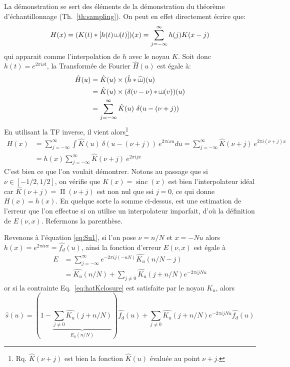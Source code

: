 \documentclass[11pt,twoside]{article}
\DeclareMathOperator{\sinc}{sinc}
\DeclareMathOperator{\comb}{\raisebox{\depth}{\rotatebox{270}{$\exists$}}}
\DeclareMathOperator{\boxcar}{{\mbox{$\Pi$}}}
\newcommand{\nn}{\nonumber}
\begin{document}
La démonstration se sert des éléments de la démonstration du théorème d'échantillonnage (Th.~\ref{th:sampling}).  On peut en effet directement écrire que:
\begin{equation}
H(x) = (K(t)\ast [h(t)\comb(t)])(x) = \sum_{j=-\infty}^\infty h(j) K(x-j)
\end{equation}
qui apparait comme l'interpolation de $h$ avec le noyau $K$. Soit donc $h(t)=e^{2\pi i \nu t}$, la Transformée de Fourier $\hat{H}(u)$ est égale à: 
\begin{align}
\hat{H}(u) &= \hat{K}(u)\times  (\hat{h}\ast \widehat{\comb})(u) \nn \\
&= \hat{K}(u)\times  (\delta(v-\nu)\ast \comb(v))(u) \nn \\
&=   \sum_{j=-\infty}^\infty \hat{K}(u)\ \delta(u-(\nu+j))
\end{align}
En utilisant la TF inverse, il vient alors\footnote{Rq. $\hat{K}(\nu+j)$ est bien la fonction $\hat{K}(u)$ évaluée au point $\nu+j$.}
\begin{align}
H(x) &=  \sum_{j=-\infty}^\infty \int  \hat{K}(u)\ \delta(u-(\nu+j))\ e^{2\pi i xu}du = \sum_{j=-\infty}^\infty \hat{K}(\nu+j)\ e^{2\pi i (\nu+j)x} \nn \\
&= h(x) \sum_{j=-\infty}^\infty \hat{K}(\nu+j)\  e^{2\pi i jx}
\end{align}
C'est bien ce que l'on voulait démontrer. Notons au passage que si $\nu\in [-1/2,1/2]$, on vérifie que $K(x)=\sinc(x)$ est bien l'interpolateur idéal car $\hat{K}(\nu+j)=\boxcar(\nu+j)$ est non nul que ssi $j=0$, ce qui donne $H(x)=h(x)$. En quelque sorte la somme ci-dessus, est une estimation de l'erreur que l'on effectue si on utilise un interpolateur imparfait, d'où la définition de $E(\nu,x)$. Refermons la parenthèse.

Revenons à l'équation \ref{eq:Su1}, si l'on pose $\nu=n/N$ et $x=-Nu$ alors $h(x)=e^{2\pi i \nu x}=\hat{f_d}(u)$, ainsi la fonction d'erreur  $E(\nu,x)$ est égale à 
\begin{align}
E &= \sum_{j=-\infty}^\infty e^{-2\pi i j (-uN)} \widehat{K_u}(n/N-j) \nn\\
&=\widehat{K_u}(n/N)  + \sum_{j\neq 0} \widehat{K_u}(j+n/N) e^{-2\pi i j N u}
\end{align}
or si la contrainte Eq.~\ref{eq:hatKclosure} est satisfaite par le noyau $K_u$, alors
\begin{equation}
\hat{s}(u)= (1-\underbrace{\sum_{j\neq 0} \widehat{K_u}(j+n/N)}_{E_0(n/N)})\hat{f_d}(u) + \sum_{j\neq 0} \widehat{K_u}(j+n/N) e^{-2\pi i j N u} \hat{f_d}(u)
\end{equation}  
\end{document}

